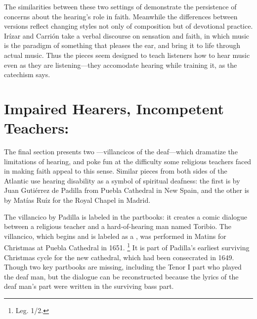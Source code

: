 The similarities between these two settings of  demonstrate the persistence of concerns about the hearing's role in faith.
Meanwhile the differences between versions reflect changing styles not only of composition but of devotional practice.
Irízar and Carrión take a verbal discourse on sensation and faith, in which music is the paradigm of something that pleases the ear, and bring it to life through actual music.
Thus the pieces seem designed to teach listeners how to hear music even as they are listening---they accomodate hearing while training it, as the catechism says.


\section{Impaired Hearers, Incompetent Teachers: }

The final section presents two ---villancicos of the deaf---which dramatize the limitations of hearing, and poke fun at the difficulty some religious teachers faced in making faith appeal to this sense.
Similar pieces from both sides of the Atlantic use hearing disability as a symbol of spiritual deafness: the first is by Juan Gutiérrez de Padilla from Puebla Cathedral in New Spain, and the other is by Matías Ruíz for the Royal Chapel in Madrid.

The villancico by Padilla is labeled  in the partbooks: it creates a comic dialogue between a religious teacher and a hard-of-hearing man named Toribio.
The villancico, which begins  and is labeled as a , was performed in Matins for Christmas at Puebla Cathedral in 1651.%
  \footnote{\signature{MEX-Pc}{Leg. 1/2}.}
It is part of Padilla's earliest surviving Christmas cycle for the new cathedral, which had been consecrated in 1649.
Though two key partbooks are missing, including the Tenor I part who played the deaf man, but the dialogue can be reconstructed because the lyrics of the deaf man's part were written in the surviving bass part.


